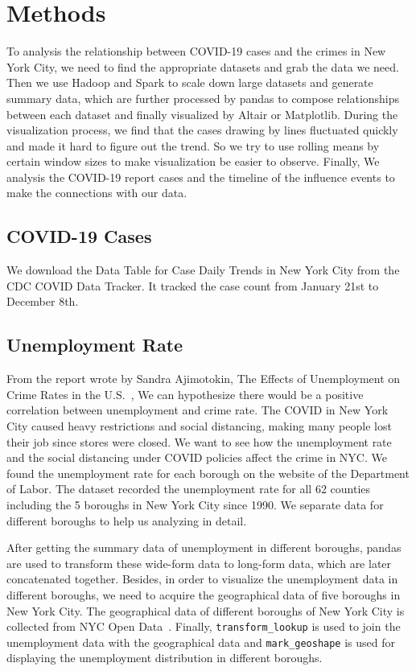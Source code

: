 \documentclass[conference]{IEEEtran}
\begin{document}
\section{Methods}
To analysis the relationship between COVID-19 cases and the crimes in New York City, we need to find the appropriate datasets and grab the data we need. Then we use Hadoop and Spark to scale down large datasets and generate summary data, which are further processed by pandas to compose relationships between each dataset and finally visualized by Altair or Matplotlib. During the visualization process, we find that the cases drawing by lines fluctuated quickly and made it hard to figure out the trend. So we try to use rolling means by certain window sizes to make visualization be easier to observe. Finally, We analysis the COVID-19 report cases and the timeline of the influence events to make the connections with our data.

\subsection{COVID-19 Cases}
We download the Data Table for Case Daily Trends in New York City from the CDC COVID Data Tracker. It tracked the case count from January 21st to December 8th. 

\subsection{Unemployment Rate}
From the report wrote by Sandra Ajimotokin, The Effects of Unemployment on Crime Rates in the U.S.~\cite{ajimotokin2015effects}, We can hypothesize there would be a positive correlation between unemployment and crime rate. The COVID in New York City caused heavy restrictions and social distancing, making many people lost their job since stores were closed. We want to see how the unemployment rate and the social distancing under COVID policies affect the crime in NYC. We found the unemployment rate for each borough on the website of the Department of Labor. The dataset recorded the unemployment rate for all 62 counties including the 5 boroughs in New York City since 1990. We separate data for different boroughs to help us analyzing in detail.

After getting the summary data of unemployment in different boroughs, pandas are used to transform these wide-form data to long-form data, which are later concatenated together. Besides, in order to visualize the unemployment data in different boroughs, we need to acquire the geographical data of five boroughs in New York City. The geographical data of different boroughs of New York City is collected from NYC Open Data~\cite{nyc2020boroughboundaries}. Finally, \verb|transform_lookup| is used to join the unemployment data with the geographical data and \verb|mark_geoshape| is used for displaying the unemployment distribution in different boroughs.
\end{document}
